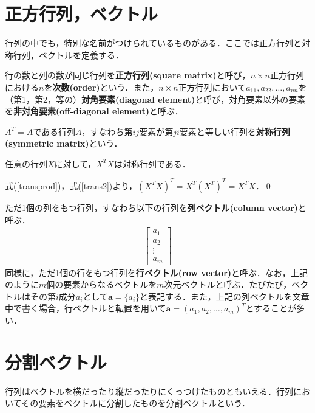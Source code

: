 \section{正方行列，ベクトル}
行列の中でも，特別な名前がつけられているものがある．ここでは正方行列と対称行列，ベクトルを定義する．

\begin{defi}[正方行列]
行の数と列の数が同じ行列を{\bf 正方行列(square matrix)}と呼び，$n\times n$正方行列における$n$を{\bf 次数(order)}という．また，$n\times n$正方行列において$a_{11},a_{22},\ldots,a_{nn}$を（第1，第2，等の）{\bf 対角要素(diagonal element)}と呼び，対角要素以外の要素を{\bf 非対角要素(off-diagonal element)}と呼ぶ．
\end{defi}

\begin{defi}[対称行列]
$A^T=A$である行列$A$，すなわち第$ij$要素が第$ji$要素と等しい行列を{\bf 対称行列(symmetric matrix)}という．
\end{defi}

\begin{theo}
任意の行列$X$に対して，$X^TX$は対称行列である．	
\end{theo}
\begin{pro}
式(\ref{transprod})，式(\ref{trans2})より，$(X^TX)^T=X^T(X^T)^T=X^TX$．\qed	
\end{pro}

\begin{defi}[ベクトル]
ただ1個の列をもつ行列，すなわち以下の行列を{\bf 列ベクトル(column vector)}と呼ぶ．
\begin{align*}
\begin{bmatrix}
a_{1} \\
a_{2} \\
\vdots \\
a_{m} 
\end{bmatrix}	
\end{align*}
同様に，ただ1個の行をもつ行列を{\bf 行ベクトル(row vector)}と呼ぶ．なお，上記のように$m$個の要素からなるベクトルを$m$次元ベクトルと呼ぶ．たびたび，ベクトルはその第$i$成分$a_{i}$として${\bm a}=\{a_{i}\}$と表記する．また，上記の列ベクトルを文章中で書く場合，行ベクトルと転置を用いて${\bm a}=(a_1,a_2,\ldots,a_m)^T$とすることが多い．
\end{defi}

\section{分割ベクトル}
行列はベクトルを横だったり縦だったりにくっつけたものともいえる．行列においてその要素をベクトルに分割したものを分割ベクトルという．

